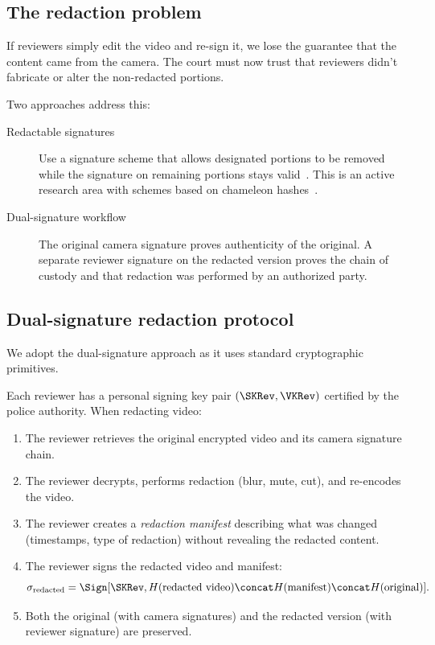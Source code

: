\subsection{The redaction problem}

If reviewers simply edit the video and re-sign it, we lose the guarantee that 
the content came from the camera.
The court must now trust that reviewers didn't fabricate or alter the 
non-redacted portions.

Two approaches address this:
\begin{description}
  \item[Redactable signatures] Use a signature scheme that allows
    designated portions to be removed while the signature on remaining
    portions stays valid~\autocite{JMSW2002redactable}.
    This is an active research area with schemes based on chameleon
    hashes~\autocite{KrawczykRabin2000chameleon}.
  \item[Dual-signature workflow] The original camera signature proves 
    authenticity of the original.
    A separate reviewer signature on the redacted version proves the chain of 
    custody and that redaction was performed by an authorized party.
\end{description}

\subsection{Dual-signature redaction protocol}

We adopt the dual-signature approach as it uses standard cryptographic 
primitives.

Each reviewer has a personal signing key pair \((\SKRev, \VKRev)\) certified by 
the police authority.
When redacting video:
\begin{enumerate}
  \item The reviewer retrieves the original encrypted video and its camera 
    signature chain.
  \item The reviewer decrypts, performs redaction (blur, mute, cut), and 
    re-encodes the video.
  \item The reviewer creates a \emph{redaction manifest} describing what was 
    changed (timestamps, type of redaction) without revealing the redacted 
    content.
  \item The reviewer signs the redacted video and manifest:
    \[
      \sigma_{\text{redacted}} = \Sign[\SKRev, H(\text{redacted video}) \concat 
      H(\text{manifest}) \concat H(\text{original})].
    \]
  \item Both the original (with camera signatures) and the redacted version 
    (with reviewer signature) are preserved.
\end{enumerate}

